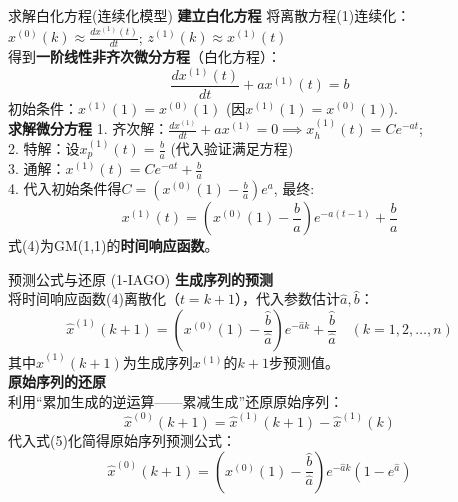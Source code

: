 \documentclass{beamer}
\begin{document}
\begin{frame}{求解白化方程(连续化模型)}
    \textbf{建立白化方程}
        将离散方程(1)连续化：
        $x^{(0)}(k) \approx \frac{dx^{(1)}(t)}{dt}$; 
        $z^{(1)}(k) \approx x^{(1)}(t)$\\
        得到\textbf{一阶线性非齐次微分方程}（白化方程）：
        \[
        \frac{dx^{(1)}(t)}{dt} + a x^{(1)}(t) = b \tag{3}
        \]
        初始条件：$x^{(1)}(1) = x^{(0)}(1)$ (因$x^{(1)}(1) = x^{(0)}(1)$). \\
    \textbf{求解微分方程}
        1. 齐次解：$\frac{dx^{(1)}}{dt} + a x^{(1)} = 0 \implies x_h^{(1)}(t) = C e^{-a t}$; \\
        2. 特解：设$x_p^{(1)}(t) = \frac{b}{a}$ (代入验证满足方程)\\
        3. 通解：$x^{(1)}(t) = C e^{-a t} + \frac{b}{a}$\\
        4. 代入初始条件得$C = \left(x^{(0)}(1) - \frac{b}{a}\right)e^a$, 最终: 
        \[
        x^{(1)}(t) = \left(x^{(0)}(1) - \frac{b}{a}\right)e^{-a(t-1)} + \frac{b}{a} \tag{4}
        \]
        式(4)为GM(1,1)的\textbf{时间响应函数}。
\end{frame}
\begin{frame}{预测公式与还原 (1-IAGO)}
    \textbf{生成序列的预测}\\
        将时间响应函数(4)离散化（$t = k+1$），代入参数估计$\hat{a},\hat{b}$：
        \[
        \hat{x}^{(1)}(k+1) = \left(x^{(0)}(1) - \frac{\hat{b}}{\hat{a}}\right)e^{-\hat{a} k} + \frac{\hat{b}}{\hat{a}} \quad (k=1,2,\dots,n) \tag{5}
        \]
        其中$\hat{x}^{(1)}(k+1)$为生成序列$x^{(1)}$的$k+1$步预测值。\\
    \textbf{原始序列的还原}\\
        利用“累加生成的逆运算——累减生成”还原原始序列：
        \[
        \hat{x}^{(0)}(k+1) = \hat{x}^{(1)}(k+1) - \hat{x}^{(1)}(k) \tag{6}
        \]
        代入式(5)化简得原始序列预测公式：
        \[
        \hat{x}^{(0)}(k+1) = \left(x^{(0)}(1) - \frac{\hat{b}}{\hat{a}}\right)e^{-\hat{a} k} (1 - e^{\hat{a}})
        \]
 \end{frame}
\end{document}
